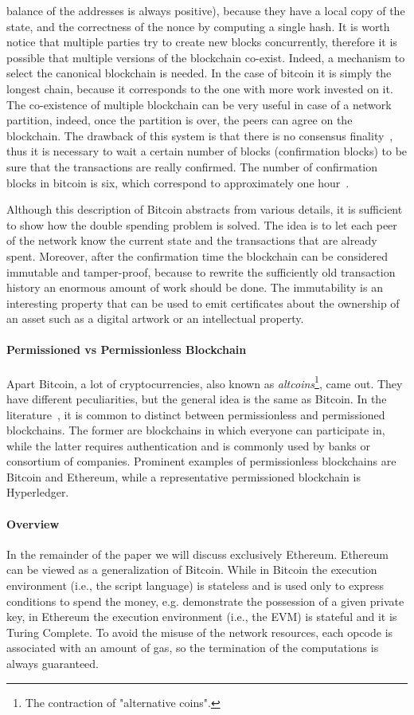 balance of the addresses is always positive), because they have a local copy of
the state, and the correctness of the nonce by computing a single hash. It is
worth notice that multiple parties try to create new blocks concurrently,
therefore it is possible that multiple versions of the blockchain co-exist.
Indeed, a mechanism to select the canonical blockchain is needed. In the case of
bitcoin it is simply the longest chain, because it corresponds to the one with
more work invested on it. The co-existence of multiple blockchain can be very
useful in case of a network partition, indeed, once the partition is over, the
peers can agree on the blockchain. The drawback of this system is that there is
no consensus finality~\cite{bib:the-quest}, thus it is necessary to wait a
certain number of blocks (confirmation blocks) to be sure that the transactions
are really confirmed. The number of confirmation blocks in bitcoin is six, which
correspond to approximately one hour~\cite{bib:masteringbitcoin}.

Although this description of Bitcoin abstracts from various details, it is
sufficient to show how the double spending problem is solved. The idea is to let
each peer of the network know the current state and the transactions that are
already spent. Moreover, after the confirmation time the blockchain can be
considered immutable and tamper-proof, because to rewrite the sufficiently old
transaction history an enormous amount of work should be done. The immutability
is an interesting property that can be used to emit certificates about the
ownership of an asset such as a digital artwork or an intellectual property.

\paragraph{Permissioned vs Permissionless Blockchain}
Apart Bitcoin, a lot of cryptocurrencies, also known as
\emph{altcoins}\footnote{The contraction of "alternative coins".}, came out.
They have different peculiarities, but the general idea is the same as Bitcoin.
In the literature~\cite{bib:the-quest}, it is common to distinct between
permissionless and permissioned blockchains. The former are blockchains in which
everyone can participate in, while the latter requires authentication and is
commonly used by banks or consortium of companies. Prominent examples of
permissionless blockchains are Bitcoin and Ethereum, while a representative
permissioned blockchain is Hyperledger.

\paragraph{Overview}
In the remainder of the paper we will discuss exclusively Ethereum. Ethereum can
be viewed as a generalization of Bitcoin. While in Bitcoin the execution
environment (i.e., the script language) is stateless and is used only to express
conditions to spend the money, e.g. demonstrate the possession of a given
private key, in Ethereum the execution environment (i.e., the EVM) is stateful
and it is Turing Complete. To avoid the misuse of the network resources, each
opcode is associated with an amount of gas, so the termination of the
computations is always guaranteed.

